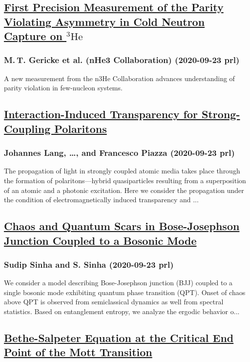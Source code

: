 \subsection*{\href{http://link.aps.org/doi/10.1103/PhysRevLett.125.131803}{First Precision Measurement of the Parity Violating Asymmetry in Cold Neutron Capture on $^{3}\mathrm{He}$}}
\subsubsection*{M. T. Gericke et al. (nHe3 Collaboration) (2020-09-23 prl)}
A new measurement from the n3He Collaboration advances understanding of parity violation in few-nucleon systems.
\subsection*{\href{http://link.aps.org/doi/10.1103/PhysRevLett.125.133604}{Interaction-Induced Transparency for Strong-Coupling Polaritons}}
\subsubsection*{Johannes Lang, \dots, and Francesco Piazza (2020-09-23 prl)}
The propagation of light in strongly coupled atomic media takes place through the formation of polaritons—hybrid quasiparticles resulting from a superposition of an atomic and a photonic excitation. Here we consider the propagation under the condition of electromagnetically induced transparency and ...
\subsection*{\href{http://link.aps.org/doi/10.1103/PhysRevLett.125.134101}{Chaos and Quantum Scars in Bose-Josephson Junction Coupled to a Bosonic Mode}}
\subsubsection*{Sudip Sinha and S. Sinha (2020-09-23 prl)}
We consider a model describing Bose-Josephson junction (BJJ) coupled to a single bosonic mode exhibiting quantum phase transition (QPT). Onset of chaos above QPT is observed from semiclassical dynamics as well from spectral statistics. Based on entanglement entropy, we analyze the ergodic behavior o...
\subsection*{\href{http://link.aps.org/doi/10.1103/PhysRevLett.125.136402}{Bethe-Salpeter Equation at the Critical End Point of the Mott Transition}}
